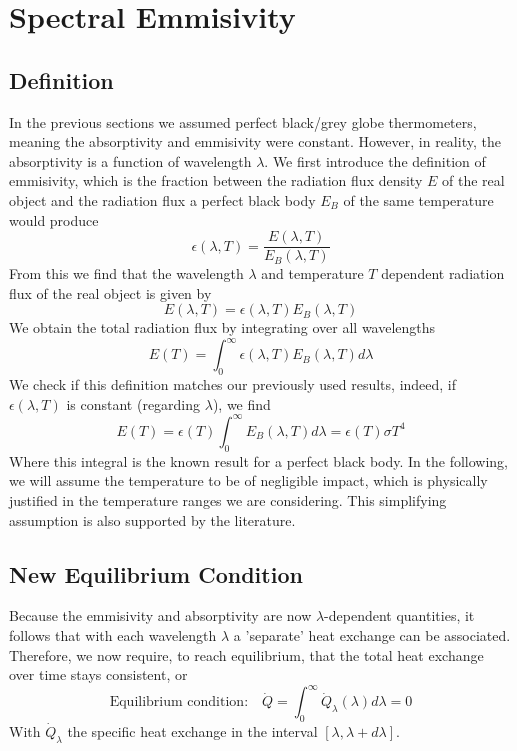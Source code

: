 \documentclass[]{scrartcl}
\begin{document}
\section{Spectral Emmisivity}
\subsection{Definition}
In the previous sections we assumed perfect black/grey globe thermometers, meaning the absorptivity and emmisivity were constant. However, in reality, the absorptivity is a function of wavelength $\lambda$. We first introduce the definition of emmisivity, which is the fraction between the radiation flux density $E$ of the real object and the radiation flux a perfect black body $E_B$ of the same temperature would produce
$$
\epsilon(\lambda, T) = \frac{E(\lambda, T)}{E_B(\lambda, T)}
$$
From this we find that the wavelength $\lambda$ and temperature $T$ dependent radiation flux of the real object is given by
$$
E(\lambda, T) = \epsilon(\lambda, T)E_B(\lambda, T)
$$
We obtain the total radiation flux by integrating over all wavelengths
\begin{equation}\label{eq:definition}
	E(T) = \int_{0}^\infty\epsilon(\lambda, T) E_B(\lambda, T) d\lambda
\end{equation}
We check if this definition matches our previously used results, indeed, if $\epsilon(\lambda, T)$ is constant (regarding $\lambda$), we find
$$
E(T) = \epsilon(T)\int_{0}^\infty E_B(\lambda, T) d\lambda = \epsilon(T)\sigma T^4
$$
Where this integral is the known result for a perfect black body. In the following, we will assume the temperature to be of negligible impact, which is physically justified in the temperature ranges we are considering. This simplifying assumption is also supported by the literature. 

\subsection{New Equilibrium Condition}
Because the emmisivity and absorptivity are now $\lambda$-dependent quantities, it follows that with each wavelength $\lambda$ a 'separate' heat exchange can be associated. Therefore, we now require, to reach equilibrium, that the total heat exchange over time stays consistent, or
\begin{equation}\label{eq:new-condition}
	\text{Equilibrium condition:} \quad \boxed{\dot{Q} = \int_{0}^{\infty}\dot{Q}_\lambda(\lambda) d\lambda = 0}
\end{equation}
With $\dot{Q}_\lambda$ the specific heat exchange in the interval $\left[\lambda, \lambda + d\lambda \right]$.
\\
\end{document}

